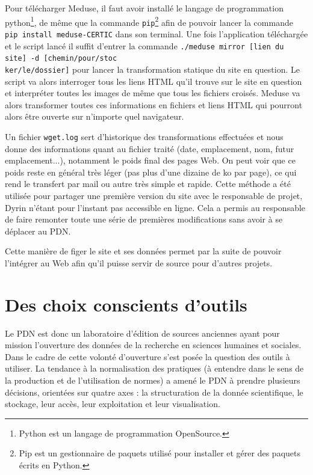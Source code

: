 \documentclass[a4paper,12pt,twoside]{book}
\begin{document}
Pour télécharger Meduse, il faut avoir installé le langage de programmation python\footnote{Python est un langage de programmation OpenSource.}, de même que la commande \texttt{pip}\footnote{Pip est un gestionnaire de paquets utilisé pour installer et gérer des paquets écrits en Python.} afin de pouvoir lancer la commande \texttt{pip install meduse-CERTIC} dans son terminal. Une fois l'application téléchargée et le script lancé il suffit d'entrer la commande \texttt{./meduse mirror [lien du site] -d [chemin/pour/stoc\\ker/le/dossier]}  pour lancer la transformation statique du site en question. Le script va alors interroger tous les liens \acrshort{HTML} qu'il trouve sur le site en question et interpréter toutes les images de même que tous les fichiers croisés. Meduse va alors transformer toutes ces informations en fichiers et liens HTML qui pourront alors être ouverte sur n'importe quel navigateur.

Un fichier \texttt{wget.log} sert d'historique des transformations effectuées et nous donne des informations quant au fichier traité (date, emplacement, nom, futur emplacement...), notamment le poids final des pages Web. On peut voir que ce poids reste en général très léger (pas plus d'une dizaine de ko par page), ce qui rend le transfert par mail ou autre très simple et rapide. Cette méthode a été utilisée pour partager une première version du site avec le responsable de projet, Dyrin n'étant pour l'instant pas accessible en ligne. Cela a permis au responsable de faire remonter toute une série de premières modifications sans avoir à se déplacer au \acrshort{PDN}.

Cette manière de figer le site et ses données permet par la suite de pouvoir l'intégrer au Web afin qu'il puisse servir de source pour d'autres projets.
   
   
    
    \chapter{Des choix conscients d'outils}
    Le \acrshort{PDN} est donc un laboratoire d'édition de sources anciennes ayant pour mission l'ouverture des données de la recherche en sciences humaines et sociales. Dans le cadre de cette volonté d'ouverture s'est posée la question des outils à utiliser. La tendance à la normalisation des pratiques (à entendre dans le sens de la production et de l'utilisation de normes) a amené le \acrshort{PDN} à prendre plusieurs décisions, orientées sur quatre axes : la structuration de la donnée scientifique, le stockage, leur accès, leur exploitation et leur visualisation.
    
\end{document}
